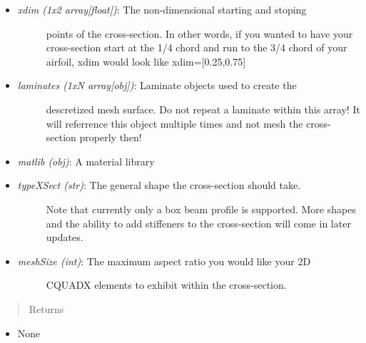 \documentclass[letterpaper,10pt,english]{sphinxmanual}
\begin{document}
\begin{fulllineitems}
\begin{fulllineitems}
\begin{itemize}
\begin{description}
\end{description}

\item {} \begin{description}
\item[{\emph{xdim (1x2 array{[}float{]})}: The non-dimensional starting and stoping}] \leavevmode
points of the cross-section. In other words, if you wanted to
have your cross-section start at the 1/4 chord and run to the
3/4 chord of your airfoil, xdim would look like xdim={[}0.25,0.75{]}

\end{description}

\item {} \begin{description}
\item[{\emph{laminates (1xN array{[}obj{]})}: Laminate objects used to create the}] \leavevmode
descretized mesh surface. Do not repeat a laminate within this
array! It will referrence this object multiple times and not
mesh the cross-section properly then!

\end{description}

\item {} 
\emph{matlib (obj)}: A material library

\item {} \begin{description}
\item[{\emph{typeXSect (str)}: The general shape the cross-section should take.}] \leavevmode
Note that currently only a box beam profile is supported.
More shapes and the ability to add stiffeners to the
cross-section will come in later updates.

\end{description}

\item {} \begin{description}
\item[{\emph{meshSize (int)}: The maximum aspect ratio you would like your 2D}] \leavevmode
CQUADX elements to exhibit within the cross-section.

\end{description}

\end{itemize}
\begin{quote}\begin{description}
\item[{Returns}] \leavevmode
\end{description}\end{quote}
\begin{itemize}
\item {} 
None


\end{itemize}
\end{fulllineitems}
\end{fulllineitems}
\end{document}
